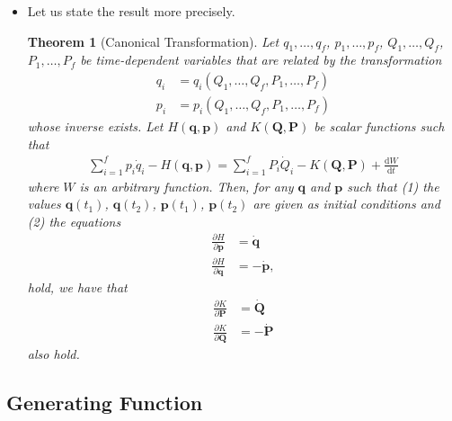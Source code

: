 \documentclass[10pt]{article}
\newtheorem{theorem}[lemma]{Theorem}
\newcommand{\dee}{\mathrm{d}}
\newcommand{\ve}[1]{\mathbf{#1}}
\begin{document}
\begin{itemize}
    \item Let us state the result more precisely.
    \begin{theorem}[Canonical Transformation]
    Let $q_1, \dotsc, q_f$, $p_1, \dotsc, p_f$, $Q_1, \dotsc, Q_f$, $P_1, \dotsc, P_f$ be time-dependent variables that are related by the transformation
    \begin{align*}
      q_i &= q_i(Q_1, \dotsc, Q_f, P_1, \dotsc, P_f) \\
      p_i &= p_i(Q_1, \dotsc, Q_f, P_1, \dotsc, P_f)
    \end{align*}
    whose inverse exists. Let $H(\ve{q},\ve{p})$ and $K(\ve{Q}, \ve{P})$ be scalar functions such that
    \begin{align} \label{canonical-transform}
      \sum_{i=1}^f p_i \dot{q}_i - H(\ve{q},\ve{p}) = \sum_{i=1}^f P_i \dot{Q}_i - K(\ve{Q}, \ve{P}) + \frac{\dee W}{\dee t}    
    \end{align}
    where $W$ is an arbitrary function. Then, for any $\ve{q}$ and $\ve{p}$ such that (1) the values $\ve{q}(t_1)$, $\ve{q}(t_2)$, $\ve{p}(t_1)$, $\ve{p}(t_2)$ are given as initial conditions and (2) the equations
    \begin{align*}
      \frac{\partial H}{\partial \ve{p}} &= \dot{\ve{q}} \\
      \frac{\partial H}{\partial \ve{q}} &= -\dot{\ve{p}},
    \end{align*}
    hold, we have that
    \begin{align*}
      \frac{\partial K}{\partial \ve{P}} &= \dot{\ve{Q}} \\
      \frac{\partial K}{\partial \ve{Q}} &= -\dot{\ve{P}}
    \end{align*}
    also hold.
    \end{theorem}
  \end{itemize}

  \subsection{Generating Function}
\end{document}
